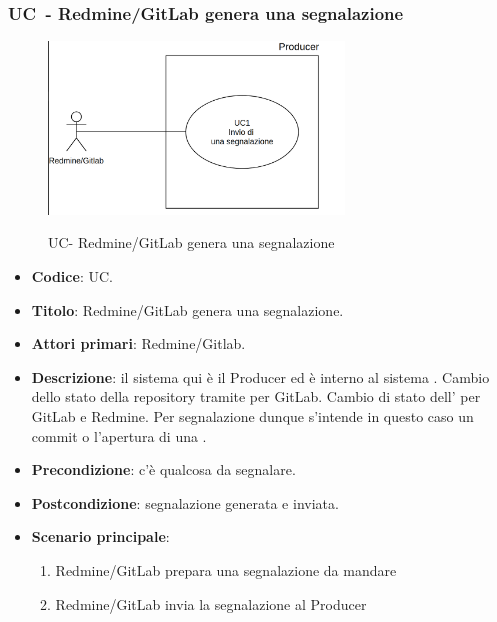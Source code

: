 \subsubsection{UC\theuccount\ - Redmine/GitLab genera una segnalazione}
    \begin{figure}[H]
		\centering
		\includegraphics[width=0.7\textwidth]{img/UC1.png}\\
		\caption{UC\theuccount - Redmine/GitLab genera una segnalazione}
	\end{figure}
	\begin{itemize}
		\item \textbf{Codice}: UC\theuccount.
		\item \textbf{Titolo}: Redmine/GitLab genera una segnalazione.
		\item \textbf{Attori primari}: Redmine/Gitlab.
		\item \textbf{Descrizione}:
		 il sistema qui è il Producer ed è interno al sistema \progetto. Cambio dello stato della repository tramite  per GitLab. Cambio di stato dell' per GitLab e Redmine. Per segnalazione dunque s'intende in questo caso un commit o l'apertura di una .
		\item \textbf{Precondizione}: c'è qualcosa da segnalare.
		\item \textbf{Postcondizione}: segnalazione generata e inviata.
		\item \textbf{Scenario principale}: 
		\begin{enumerate}
			\item Redmine/GitLab prepara una segnalazione da mandare
			\item Redmine/GitLab invia la segnalazione al Producer
		\end{enumerate}
		
	\end{itemize}

